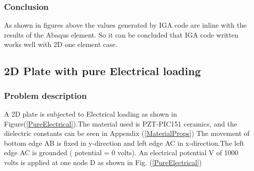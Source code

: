 \documentclass[11pt]{article}
\begin{document}
\subsubsection{Conclusion}
As shown in figures above the values generated by IGA code are inline with the results of the Abaqus element. So it can be concluded that IGA code written works well with 2D one element case.






\subsection{2D Plate with pure Electrical loading}
\subsubsection{Problem description}
A 2D plate is subjected to Electrical loading as shown in Figure(\ref{PureElectrical}).The material used is PZT-PIC151 ceramics, and the dielectric constants can be seen in Appendix (\ref{MaterialProps})
The movement of bottom edge AB is fixed in y-direction and left edge AC in x-direction.The left edge AC is grounded ( potential = 0 volts). An electrical potential V of 1000 volts is applied at one node D as shown in Fig. (\ref{PureElectrical})
\end{document}
